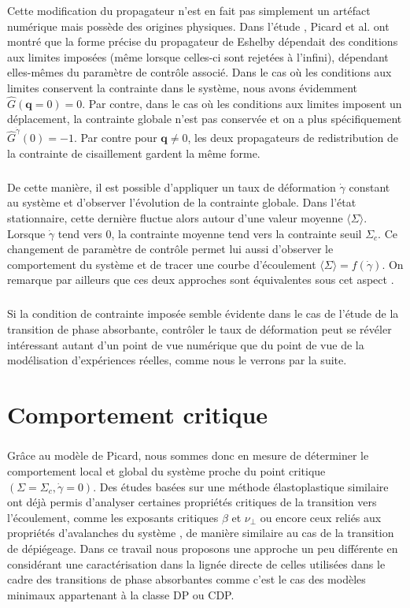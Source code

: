 \noindent Cette modification du propagateur n'est en fait pas simplement un artéfact numérique mais possède des origines physiques. Dans l'étude \cite{picard_elastic_2004}, Picard et al. ont montré que la forme précise du propagateur de Eshelby dépendait des conditions aux limites imposées (même lorsque celles-ci sont rejetées à l'infini), dépendant elles-mêmes du paramètre de contrôle associé. Dans le cas où les conditions aux limites conservent la contrainte dans le système, nous avons évidemment $\hat{G}(\mathbf{q}=0) = 0$. Par contre, dans le cas où les conditions aux limites imposent un déplacement, la contrainte globale n'est pas conservée et on a plus spécifiquement $\hat{G}^{\dot{\gamma}}(0) = -1$. Par contre pour $\mathbf{q}\neq 0$, les deux propagateurs de redistribution de la contrainte de cisaillement gardent la même forme.

\subparagraph{}De cette manière, il est possible d'appliquer un taux de déformation $\dot{\gamma}$ constant au système et d'observer l'évolution de la contrainte globale. Dans l'état stationnaire, cette dernière fluctue alors autour d'une valeur moyenne $\langle \Sigma\rangle$. Lorsque $\dot{\gamma}$ tend vers $0$, la contrainte moyenne tend vers la contrainte seuil $\Sigma_c$. Ce changement de paramètre de contrôle permet lui aussi d'observer le comportement du système et de tracer une courbe d'écoulement $\langle \Sigma \rangle = f(\dot{\gamma})$. On remarque par ailleurs que ces deux approches sont équivalentes sous cet aspect \cite{liu_driving_2016}.

\subparagraph{}Si la condition de contrainte imposée semble évidente dans le cas de l'étude de la transition de phase absorbante, contrôler le taux de déformation peut se révéler intéressant autant d'un point de vue numérique que du point de vue de la modélisation d'expériences réelles, comme nous le verrons par la suite.

\section{Comportement critique}


\subparagraph{}Grâce au modèle de Picard, nous sommes donc en mesure de déterminer le comportement local et global du système proche du point critique $(\Sigma = \Sigma_c, \dot{\gamma} = 0)$. Des études basées sur une méthode élastoplastique similaire ont déjà permis d'analyser certaines propriétés critiques de la transition vers l'écoulement, comme les exposants critiques $\beta$ \cite{lin_scaling_2014, ferrero_criticality_2019, liu_driving_2016, jagla_different_2017} et $\nu_\perp$ \cite{lin_scaling_2014, korchinski_thermally_2024} ou encore ceux reliés aux propriétés d'avalanches du système \cite{liu_driving_2016, ferrero_criticality_2019, lin_scaling_2014, budrikis_universal_2017}, de manière similaire au cas de la transition de dépiégeage. Dans ce travail nous proposons une approche un peu différente en considérant une caractérisation dans la lignée directe de celles utilisées dans le cadre des transitions de phase absorbantes comme c'est le cas des modèles minimaux appartenant à la classe DP ou CDP.

